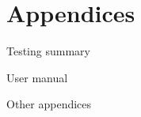 \documentclass{article}
\begin{document}
\section{Appendices}

Testing summary

User manual
 

Other appendices
\end{document}
